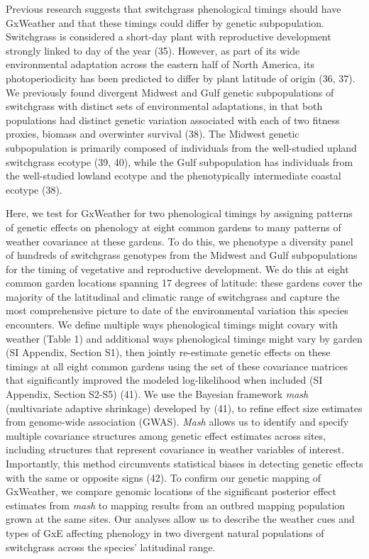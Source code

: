 \documentclass[
  9pt,
  twocolumn,
  twoside]{pnas-new}
\begin{document}
Previous research suggests that switchgrass phenological timings should
have GxWeather and that these timings could differ by genetic
subpopulation. Switchgrass is considered a short-day plant with
reproductive development strongly linked to day of the year (35).
However, as part of its wide environmental adaptation across the eastern
half of North America, its photoperiodicity has been predicted to differ
by plant latitude of origin (36, 37). We previously found divergent
Midwest and Gulf genetic subpopulations of switchgrass with distinct
sets of environmental adaptations, in that both populations had distinct
genetic variation associated with each of two fitness proxies, biomass
and overwinter survival (38). The Midwest genetic subpopulation is
primarily composed of individuals from the well-studied upland
switchgrass ecotype (39, 40), while the Gulf subpopulation has
individuals from the well-studied lowland ecotype and the phenotypically
intermediate coastal ecotype (38).

Here, we test for GxWeather for two phenological timings by assigning
patterns of genetic effects on phenology at eight common gardens to many
patterns of weather covariance at these gardens. To do this, we
phenotype a diversity panel of hundreds of switchgrass genotypes from
the Midwest and Gulf subpopulations for the timing of vegetative and
reproductive development. We do this at eight common garden locations
spanning 17 degrees of latitude: these gardens cover the majority of the
latitudinal and climatic range of switchgrass and capture the most
comprehensive picture to date of the environmental variation this
species encounters. We define multiple ways phenological timings might
covary with weather (Table 1) and additional ways phenological timings
might vary by garden (SI Appendix, Section S1), then jointly re-estimate
genetic effects on these timings at all eight common gardens using the
set of these covariance matrices that significantly improved the modeled
log-likelihood when included (SI Appendix, Section S2-S5) (41). We use
the Bayesian framework \emph{mash} (multivariate adaptive shrinkage)
developed by (41), to refine effect size estimates from genome-wide
association (GWAS). \emph{Mash} allows us to identify and specify
multiple covariance structures among genetic effect estimates across
sites, including structures that represent covariance in weather
variables of interest. Importantly, this method circumvents statistical
biases in detecting genetic effects with the same or opposite signs
(42). To confirm our genetic mapping of GxWeather, we compare genomic
locations of the significant posterior effect estimates from \emph{mash}
to mapping results from an outbred mapping population grown at the same
sites. Our analyses allow us to describe the weather cues and types of
GxE affecting phenology in two divergent natural populations of
switchgrass across the species' latitudinal range.
\end{document}
